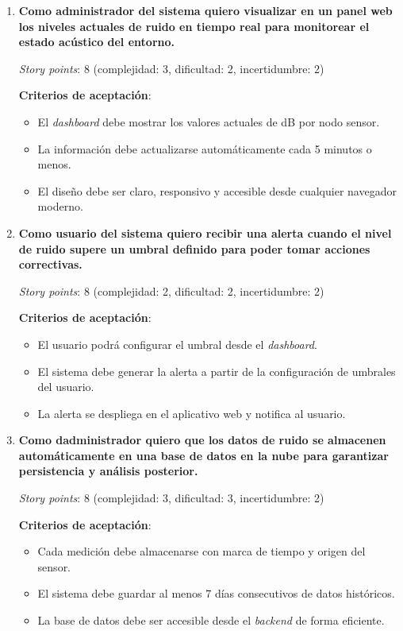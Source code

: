 \documentclass[
11pt, %
]{charter}
\begin{document}
\begin{enumerate}
    \item \textbf{Como administrador del sistema quiero visualizar en un panel web los niveles actuales de ruido en tiempo real para monitorear el estado acústico del entorno.}

    \textit{Story points}: 8 (complejidad: 3, dificultad: 2, incertidumbre: 2)

    \textbf{Criterios de aceptación}:
    \begin{itemize}
        \item El \textit{dashboard} debe mostrar los valores actuales de dB por nodo sensor.
        \item La información debe actualizarse automáticamente cada 5 minutos o menos.
        \item El diseño debe ser claro, responsivo y accesible desde cualquier navegador moderno.
    \end{itemize}

    \item \textbf{Como usuario del sistema quiero recibir una alerta cuando el nivel de ruido supere un umbral definido para poder tomar acciones correctivas.}

    \textit{Story points}: 8 (complejidad: 2, dificultad: 2, incertidumbre: 2)

    \textbf{Criterios de aceptación}:
    \begin{itemize}
        \item El usuario podrá configurar el umbral desde el \textit{dashboard}.
        \item El sistema debe generar la alerta a partir de la configuración de umbrales del usuario.
        \item La alerta se despliega en el aplicativo web y notifica al usuario.
    \end{itemize}

    \item \textbf{Como dadministrador quiero que los datos de ruido se almacenen automáticamente en una base de datos en la nube para garantizar persistencia y análisis posterior.}

    \textit{Story points}: 8 (complejidad: 3, dificultad: 3, incertidumbre: 2)

    \textbf{Criterios de aceptación}:
    \begin{itemize}
        \item Cada medición debe almacenarse con marca de tiempo y origen del sensor.
        \item El sistema debe guardar al menos 7 días consecutivos de datos históricos.
        \item La base de datos debe ser accesible desde el \textit{backend} de forma eficiente.
    \end{itemize}


\end{enumerate}
\end{document}
